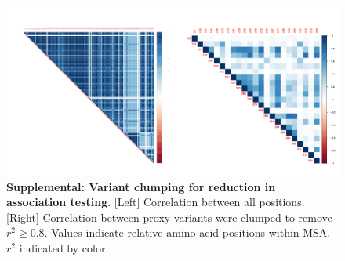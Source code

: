 \documentclass{article} %
\begin{document}
\begin{figure}[ht] \hspace{-0.5cm} 
    \includegraphics[scale=0.85]{S1}
	\caption{\textbf{Supplemental: Variant clumping for reduction in association testing}. [Left] Correlation between all positions. [Right] Correlation between proxy variants were clumped to remove $r^2 \ge 0.8$. Values indicate relative amino acid positions within MSA. $r^2$ indicated by color.}
	\label{fig:clumping}
\end{figure}
\end{document}
